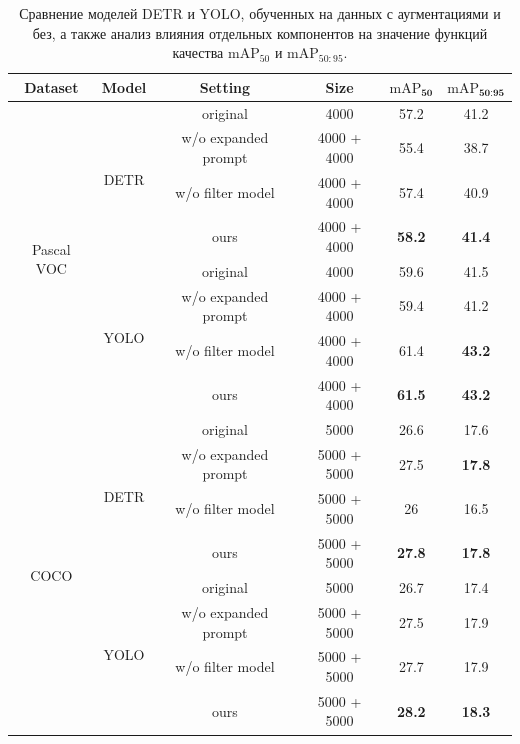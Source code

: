 \begin{table}[p]
\centering
\setlength{\tabcolsep}{2.5pt} %
\begin{tabular}{cccc|cc}
\toprule
\textbf{Dataset} & \textbf{Model} & \textbf{Setting} & \textbf{Size} & \textbf{$\text{mAP}_{\textbf{50}}$} & \textbf{$\text{mAP}_{\textbf{50:95}}$} \\
\midrule
\multirow{8}{*}{Pascal VOC} 
    & \multirow{4}{*}{DETR}
        & original                     & 4000  & 57.2 & 41.2 \\
        &                              & w/o expanded prompt          & 4000 + 4000  & 55.4 & 38.7 \\
        &                              & w/o filter model             & 4000 + 4000  & 57.4 & 40.9 \\
        &                              & ours                          & 4000 + 4000  & \textbf{58.2} & \textbf{41.4} \\
    \cline{2-6}
    & \multirow{4}{*}{YOLO}
        & original                     & 4000  & 59.6 & 41.5 \\
        &                              & w/o expanded prompt          & 4000 + 4000  & 59.4 & 41.2 \\
        &                              & w/o filter model             & 4000 + 4000  & 61.4 & \textbf{43.2} \\
        &                              & ours                          & 4000 + 4000  & \textbf{61.5} & \textbf{43.2} \\
\midrule
\multirow{8}{*}{COCO} 
    & \multirow{4}{*}{DETR}
        & original                     & 5000 & 26.6 & 17.6 \\
        &                              & w/o expanded prompt          & 5000 + 5000 & 27.5 & \textbf{17.8} \\
        &                              & w/o filter model             & 5000 + 5000 & 26 & 16.5 \\
        &                              & ours                          & 5000 + 5000 & \textbf{27.8} & \textbf{17.8} \\
    \cline{2-6}
    & \multirow{4}{*}{YOLO}
        & original                     & 5000 & 26.7 & 17.4 \\
        &                              & w/o expanded prompt          & 5000 + 5000 & 27.5 & 17.9 \\
        &                              & w/o filter model             & 5000 + 5000 & 27.7 & 17.9 \\
        &                              & ours                          & 5000 + 5000 & \textbf{28.2} & \textbf{18.3} \\
\bottomrule
\end{tabular}
\caption{Сравнение моделей DETR и YOLO, обученных на данных с аугментациями и без, а также анализ влияния отдельных компонентов на значение функций качества $\text{mAP}_{50}$ и $\text{mAP}_{50:95}$.}
\label{tab:augmented-metrics}
\end{table}


